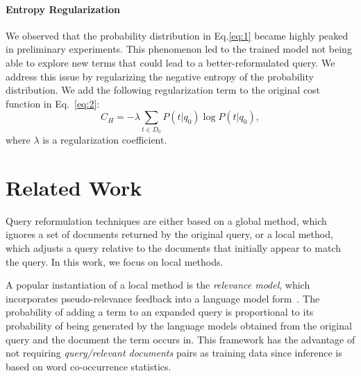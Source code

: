 \documentclass[11pt,letterpaper]{article}
\newcommand{\todo}[1]{{\Large\textcolor{red}{#1}}}
\begin{document}
\paragraph{Entropy Regularization}
We observed that the probability distribution in Eq.\eqref{eq:1} became highly peaked in preliminary experiments. This phenomenon led to the trained model not being able to explore new terms that could lead to a better-reformulated query. We address this issue by regularizing the negative entropy of the probability distribution. We add the following regularization term to the original cost function in Eq.~\eqref{eq:2}:
\begin{equation}
	C_H = -\lambda \sum_{t \in D_0} P(t|q_0)\log P(t|q_0),
\end{equation}
where $\lambda$ is a regularization coefficient.


\section{Related Work}

Query reformulation techniques are either based on a global method, which ignores a set of documents returned by the original query, or a local method, which adjusts a query relative to the documents that initially appear to match the query. In this work, we focus on local methods.

A popular instantiation of a local method is the \textit{relevance model}, which incorporates pseudo-relevance feedback into a language model form~\cite{lavrenko2001relevance}. The probability of adding a term to an expanded query is proportional to its probability of being generated by the language models obtained from the original query and the document the term occurs in. This framework has the advantage of not requiring \textit{query/relevant documents} pairs as training data since inference is based on word co-occurrence statistics.


\end{document}
